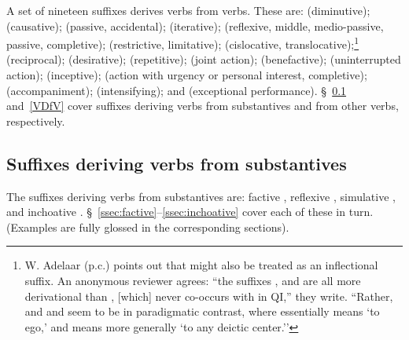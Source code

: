 A set of nineteen suffixes derives verbs from verbs. These are:  (diminutive);  (causative);  (passive, accidental);  (iterative);  (reflexive, middle, medio-passive, passive, completive);  (restrictive, limitative);  (cislocative, translocative);\footnote{W. Adelaar (p.c.) points out that  might also be treated as an inflectional suffix. An anonymous reviewer agrees: ``the suffixes ,  and  are all more derivational than , [which] never co-occurs with  in QI,'' they write. ``Rather,  and and  seem to be in paradigmatic contrast, where  essentially means `to ego,' and  means more generally `to any deictic center.''}  (reciprocal);  (desirative);  (repetitive);  (joint action);  (benefactive);  (uninterrupted action);  (inceptive);  (action with urgency or personal interest, completive);  (accompaniment);  (intensifying); and  (exceptional performance). \S~\ref{ssec:ADVS} and~\ref{VDfV} cover suffixes deriving verbs from substantives and from other verbs, respectively.

\subsection{Suffixes deriving verbs from substantives}\label{ssec:ADVS}
The suffixes deriving verbs from substantives are: factive , reflexive , simulative , and inchoative . \S~\ref{ssec:factive}--\ref{ssec:inchoative} cover each of these in turn. (Examples are fully glossed in the corresponding sections).


